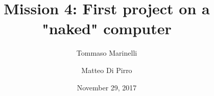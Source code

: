 \documentclass[a4paper,10pt]{article}
\begin{document}
\title{Mission 4: First project on a "naked" computer}
\author{Tommaso Marinelli \and Matteo Di Pirro}
\date{November 29, 2017}

\maketitle






\newpage
\appendix

\end{document}
